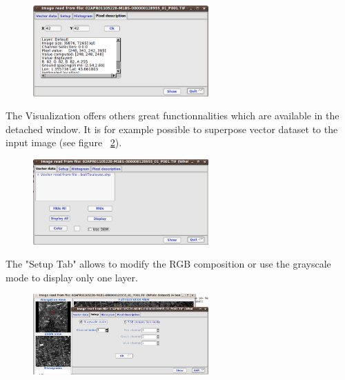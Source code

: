 \begin{figure} 
  \center
  \includegraphics[width=0.6\textwidth]{../Art/MonteverdiImages/monteverdi_viewer_pixel_description.png}
  \label{fig:viewerpixeldescription}
\end{figure}

The Visualization offers others great functionnalities which are
available in the detached window.  It is for example possible to
superpose vector dataset to the input image (see figure
~\ref{fig:viewervectordata}).

\begin{figure}
  \center
  \includegraphics[width=0.6\textwidth]{../Art/MonteverdiImages/monteverdi_viewer_vector_data.png}
  \label{fig:viewervectordata}
\end{figure}

The "Setup Tab" allows to modify the RGB composition or use the
grayscale mode to display only one layer.

\begin{figure}
  \center
  \includegraphics[width=0.6\textwidth]{../Art/MonteverdiImages/monteverdi_viewer_rgb_composition.png}
  \label{fig:rgbcomposition}
\end{figure}

